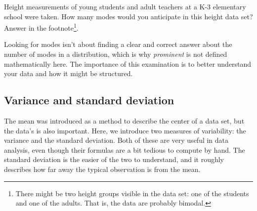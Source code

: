 \begin{exercise}
Height measurements of young students and adult teachers at a K-3 elementary school were taken. How many modes would you anticipate in this height data set? Answer in the footnote\footnote{There might be two height groups visible in the data set: one of the students and one of the adults. That is, the data are probably bimodal.}.
\end{exercise}

\begin{tipBox}{
Looking for modes isn't about finding a clear and correct answer about the number of modes in a distribution, which is why \emph{prominent} is not defined mathematically here. The importance of this examination is to better understand your data and how it might be structured.}
\end{tipBox}


\subsection{Variance and standard deviation}
\label{variability}

The mean was introduced as a method to describe the center of a data set, but the data's  is also important. Here, we introduce two measures of variability: the variance and the standard deviation. Both of these are very useful in data analysis, even though their formulas are a bit tedious to compute by hand. The standard deviation is the easier of the two to understand, and it roughly describes how far away the typical observation is from the mean.

